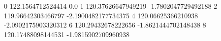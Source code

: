 0 122.1564712524414 0.0
1 120.37626647949219 -1.7802047729492188
2 119.96642303466797 -2.1900482177734375
4 120.06625366210938 -2.0902175903320312
6 120.29432678222656 -1.8621444702148438
8 120.17488098144531 -1.9815902709960938
